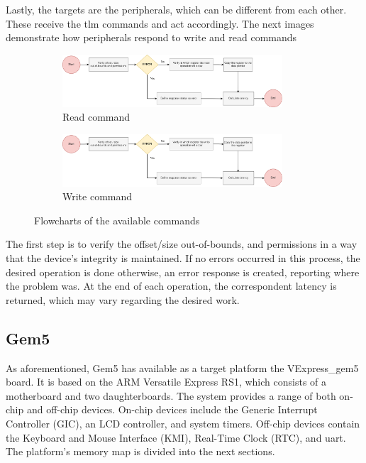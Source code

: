 Lastly, the targets are the peripherals, which can be different from each other. These receive the 
\gls{tlm} commands and act accordingly. The next images demonstrate how peripherals respond to write and read commands 

\begin{figure}[H]
	\centering
	\begin{subfigure}{\textwidth}
		\centering
		\includegraphics[width=0.9\textwidth]{Images/CoSimReadOperation.png}
 		\caption[1\textwidth]{Read command}
	\end{subfigure}
	\begin{subfigure}{\textwidth}
		\centering
		\includegraphics[width=0.9\textwidth]{Images/CoSimWriteOperation.png}
		\caption[1\textwidth]{Write command}
	\end{subfigure}
		
	\caption{Flowcharts of the available commands}
\end{figure}

The first step is to verify the offset/size out-of-bounds, and permissions in a way that the device's integrity is maintained. If no errors occurred 
in this process, the desired operation is done otherwise, an error response is created, reporting where the problem was. 
At the end of each operation, the correspondent latency is returned, which may vary regarding the desired work. 

\subsection{Gem5}

As aforementioned, Gem5 has available as a target platform the VExpress\_gem5 board. It is based on the ARM Versatile Express RS1, which 
consists of a motherboard and two daughterboards. The system provides a range of both on-chip and off-chip devices.
On-chip devices include the Generic Interrupt Controller (GIC), an LCD controller, and system timers.
Off-chip devices contain the Keyboard and Mouse Interface (KMI), Real-Time Clock (RTC), and \gls{uart}. 
The platform's memory map is divided into the next sections.

